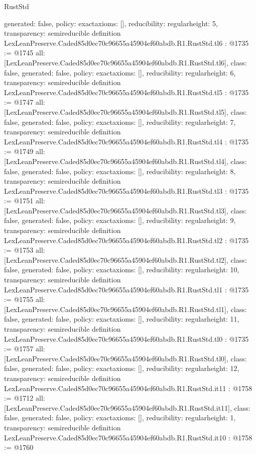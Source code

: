 \begin{lexlean}{RustStd}
\begin{coremodule}
{  generated: false,
  policy: exact{axioms: []},
  reducibility: regular{height: 5},
  transparency: semireducible
}
definition LexLeanPreserve.Caded85d0ec70c96655a45904ef60abdb.R1.RustStd.tl6 : @1735 := @1745 {
  all: [LexLeanPreserve.Caded85d0ec70c96655a45904ef60abdb.R1.RustStd.tl6],
  class: false,
  generated: false,
  policy: exact{axioms: []},
  reducibility: regular{height: 6},
  transparency: semireducible
}
definition LexLeanPreserve.Caded85d0ec70c96655a45904ef60abdb.R1.RustStd.tl5 : @1735 := @1747 {
  all: [LexLeanPreserve.Caded85d0ec70c96655a45904ef60abdb.R1.RustStd.tl5],
  class: false,
  generated: false,
  policy: exact{axioms: []},
  reducibility: regular{height: 7},
  transparency: semireducible
}
definition LexLeanPreserve.Caded85d0ec70c96655a45904ef60abdb.R1.RustStd.tl4 : @1735 := @1749 {
  all: [LexLeanPreserve.Caded85d0ec70c96655a45904ef60abdb.R1.RustStd.tl4],
  class: false,
  generated: false,
  policy: exact{axioms: []},
  reducibility: regular{height: 8},
  transparency: semireducible
}
definition LexLeanPreserve.Caded85d0ec70c96655a45904ef60abdb.R1.RustStd.tl3 : @1735 := @1751 {
  all: [LexLeanPreserve.Caded85d0ec70c96655a45904ef60abdb.R1.RustStd.tl3],
  class: false,
  generated: false,
  policy: exact{axioms: []},
  reducibility: regular{height: 9},
  transparency: semireducible
}
definition LexLeanPreserve.Caded85d0ec70c96655a45904ef60abdb.R1.RustStd.tl2 : @1735 := @1753 {
  all: [LexLeanPreserve.Caded85d0ec70c96655a45904ef60abdb.R1.RustStd.tl2],
  class: false,
  generated: false,
  policy: exact{axioms: []},
  reducibility: regular{height: 10},
  transparency: semireducible
}
definition LexLeanPreserve.Caded85d0ec70c96655a45904ef60abdb.R1.RustStd.tl1 : @1735 := @1755 {
  all: [LexLeanPreserve.Caded85d0ec70c96655a45904ef60abdb.R1.RustStd.tl1],
  class: false,
  generated: false,
  policy: exact{axioms: []},
  reducibility: regular{height: 11},
  transparency: semireducible
}
definition LexLeanPreserve.Caded85d0ec70c96655a45904ef60abdb.R1.RustStd.tl0 : @1735 := @1757 {
  all: [LexLeanPreserve.Caded85d0ec70c96655a45904ef60abdb.R1.RustStd.tl0],
  class: false,
  generated: false,
  policy: exact{axioms: []},
  reducibility: regular{height: 12},
  transparency: semireducible
}
definition LexLeanPreserve.Caded85d0ec70c96655a45904ef60abdb.R1.RustStd.it11 : @1758 := @1712 {
  all: [LexLeanPreserve.Caded85d0ec70c96655a45904ef60abdb.R1.RustStd.it11],
  class: false,
  generated: false,
  policy: exact{axioms: []},
  reducibility: regular{height: 1},
  transparency: semireducible
}
definition LexLeanPreserve.Caded85d0ec70c96655a45904ef60abdb.R1.RustStd.it10 : @1758 := @1760 {
}
\end{coremodule}
\end{lexlean}
